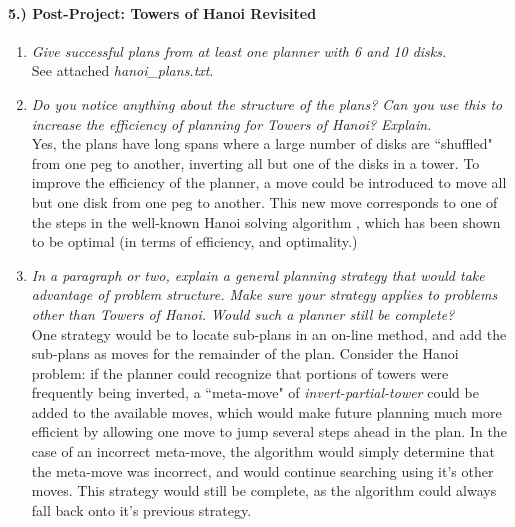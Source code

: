 \documentclass{article}
\begin{document}
\paragraph{5.) Post-Project: Towers of Hanoi Revisited}

\begin{enumerate}
\item{\textit{Give successful plans from at least one planner with 6 and 10 disks.\\}}
See attached \textit{hanoi\_plans.txt}.

\item{\textit{Do you notice anything about the structure of the plans? Can you use this to increase the efficiency of planning for Towers of Hanoi? Explain.\\}}
Yes, the plans have long spans where a large number of disks are ``shuffled" from one peg to another, inverting all but one of the disks in a tower.  To improve the efficiency of the planner, a move could be introduced to move all but one disk from one peg to another. This new move corresponds to one of the steps in the well-known Hanoi solving algorithm \cite{cutTheKnotHanoiAlgorithm}, which has been shown to be optimal (in terms of efficiency, and optimality.)

\item{\textit{In a paragraph or two, explain a general planning strategy that would take advantage of problem structure. Make sure your strategy applies to problems other than Towers of Hanoi. Would such a planner still be complete?\\}}
One strategy would be to locate sub-plans in an on-line method, and add the sub-plans as moves for the remainder of the plan.  Consider the Hanoi problem: if the planner could recognize that portions of towers were frequently being inverted, a ``meta-move" of \textit{invert-partial-tower} could be added to the available moves, which would make future planning much more efficient by allowing one move to jump several steps ahead in the plan.  In the case of an incorrect meta-move, the algorithm would simply determine that the meta-move was incorrect, and would continue searching using it's other moves.  This strategy would still be complete, as the algorithm could always fall back onto it's previous strategy.


\end{enumerate}



\end{document}
